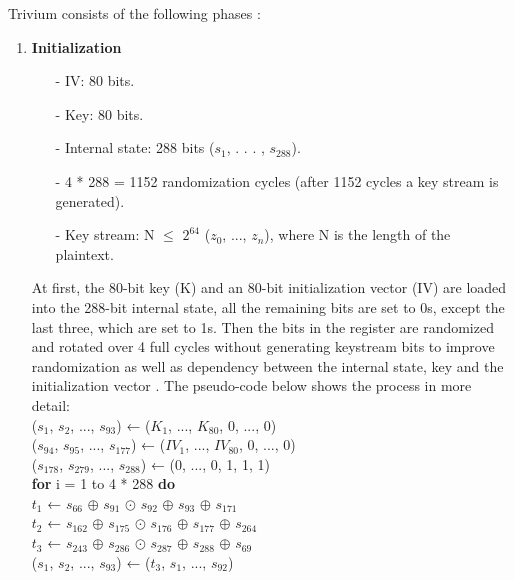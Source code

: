 Trivium consists of the following phases \cite{canniere2008trivium}:
\begin{enumerate}
	\item \textbf{Initialization}
	\begin{itemize}
		\setlength\itemsep{0.1em}
		\item[-] IV: 80 bits.
		\item[-] Key: 80 bits.
		\item[-] Internal state: 288 bits ($s_1$, . . . , $s_{288}$). 
		\item[-] 4 * 288 = 1152 randomization cycles (after 1152 cycles a key stream is generated).
		\item[-] Key stream: N $\leq$ $2^{64}$ ($z_0$, ..., $z_n$), where N is the length of the plaintext.
	\end{itemize}
	At first, the  80-bit key (K) and an 80-bit initialization vector (IV) are loaded into the 288-bit internal state, all the remaining bits are set to 0s, except the last three, which are set to 1s. Then the bits in the register are randomized and rotated over 4 full cycles without generating keystream bits to improve randomization as well as dependency between the internal state, key and the initialization vector .
	The pseudo-code below shows the process in more detail:
	\vspace{0.5em}
	\\
	{\selectfont
		($s_1$, $s_2$, ..., $s_93$) ← ($K_1$, ..., $K_{80}$, 0, ..., 0)\\
		($s_{94}$, $s_{95}$, ..., $s_{177}$) ← ($IV_1$, ..., $IV_{80}$, 0, ..., 0)\\
		($s_{178}$, $s_{279}$, ..., $s_{288}$) ← (0, ..., 0, 1, 1, 1)\\
		\textbf{for} i = 1 to 4 * 288 \textbf{do} \\
		\indent\hspace{1cm}$t_1$ ← $s_{66}$ $\oplus$ $s_{91}$ $\odot$ $s_{92}$ $\oplus$ $s_{93}$ $\oplus$ $s_{171}$\\
		\indent\hspace{1cm} $t_2$ ← $s_{162}$ $\oplus$ $s_{175}$ $\odot$ $s_{176}$ $\oplus$ $s_{177}$ $\oplus$ $s_{264}$\\
		\indent\hspace{1cm} $t_3$ ← $s_{243}$ $\oplus$ $s_{286}$ $\odot$ $s_{287}$ $\oplus$ $s_{288}$ $\oplus$ $s_{69}$\\
		\indent\hspace{1cm}($s_1$, $s_2$, ..., $s_{93}$) ← ($t_3$, $s_1$, ..., $s_{92}$)\\
}
\end{enumerate}
